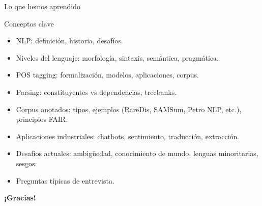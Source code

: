 \documentclass[aspectratio=169, 10pt, xcolor=table]{beamer}
\begin{document}
\begin{frame}{Lo que hemos aprendido}
    \begin{exampleblock}{Conceptos clave}
        \begin{itemize}
            \item NLP: definición, historia, desafíos.
            \item Niveles del lenguaje: morfología, sintaxis, semántica, pragmática.
            \item POS tagging: formalización, modelos, aplicaciones, corpus.
            \item Parsing: constituyentes vs dependencias, treebanks.
            \item Corpus anotados: tipos, ejemplos (RareDis, SAMSum, Petro NLP, etc.), principios FAIR.
            \item Aplicaciones industriales: chatbots, sentimiento, traducción, extracción.
            \item Desafíos actuales: ambigüedad, conocimiento de mundo, lenguas minoritarias, sesgos.
            \item Preguntas típicas de entrevista.
        \end{itemize}
    \end{exampleblock}
\end{frame}

\begin{frame}
    \centering
    \Huge \textbf{¡Gracias!}

\end{frame}
\end{document}

